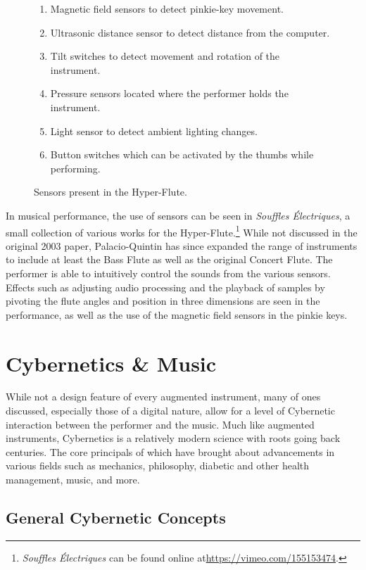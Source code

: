 \begin{figure}
    \centering
    \begin{enumerate}
        \item Magnetic field sensors to detect pinkie-key movement.
        \item Ultrasonic distance sensor to detect distance from the computer.
        \item Tilt switches to detect movement and rotation of the instrument.
        \item Pressure sensors located where the performer holds the instrument.
        \item Light sensor to detect ambient lighting changes.
        \item Button switches which can be activated by the thumbs while performing.
    \end{enumerate}
    \caption{Sensors present in the Hyper-Flute.}
    \label{fig:hyper-flute-sensors}
\end{figure}

In musical performance, the use of sensors can be seen in \textit{Souffles Électriques}, a small collection of various works for the Hyper-Flute.\footnote{\textit{Souffles Électriques} can be found online at\url{https://vimeo.com/155153474}.} While not discussed in the original 2003 paper, Palacio-Quintin has since expanded the range of instruments to include at least the Bass Flute as well as the original Concert Flute. The performer is able to intuitively control the sounds from the various sensors. Effects such as adjusting audio processing and the playback of samples by pivoting the flute angles and position in three dimensions are seen in the performance, as well as the use of the magnetic field sensors in the pinkie keys.


\section{Cybernetics \& Music}
While not a design feature of every augmented instrument, many of ones discussed, especially those of a digital nature, allow for a level of Cybernetic interaction between the performer and the music. Much like augmented instruments, Cybernetics is a relatively modern science with roots going back centuries. The core principals of which have brought about advancements in various fields such as mechanics, philosophy, diabetic and other health management, music, and more. 

\subsection{General Cybernetic Concepts} %

